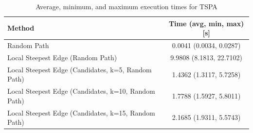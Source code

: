 \begin{table}[h!]
\centering
\begin{tabular}{lc}
\hline
Method & Time (avg, min, max) [s] \\
\hline
Random Path & 0.0041 (0.0034, 0.0287) \\
Local Steepest Edge (Random Path) & 9.9808 (8.1813, 22.7102) \\
Local Steepest Edge (Candidates, k=5, Random Path) & 1.4362 (1.3117, 5.7258) \\
Local Steepest Edge (Candidates, k=10, Random Path) & 1.7788 (1.5927, 5.8011) \\
Local Steepest Edge (Candidates, k=15, Random Path) & 2.1685 (1.9311, 5.5743) \\
\hline
\end{tabular}
\caption{Average, minimum, and maximum execution times for TSPA}
\label{tab:TSPA_timings}
\end{table}
